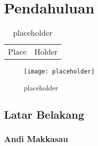 \documentclass[../projects/thesis.tex]{subfiles}
\begin{document}
\chapter{Pendahuluan}\label{chap:pendahuluan}

\lipsum[1-2] \citep{muhadjir1996metodologi}


\begin{table}[htpb]
    \centering
    \caption{placeholder}
    \label{tab:place}
    \begin{tabular}{l l}
    Place & Holder \\
    \end{tabular}
\end{table}

\begin{figure}[htpb]
    \centering
    \texttt{[image: placeholder]}
    \caption{placeholder}
    \label{fig:placeholder}
\end{figure}

\section{Latar Belakang}

\subsection{Andi Makkasau}

\end{document}
